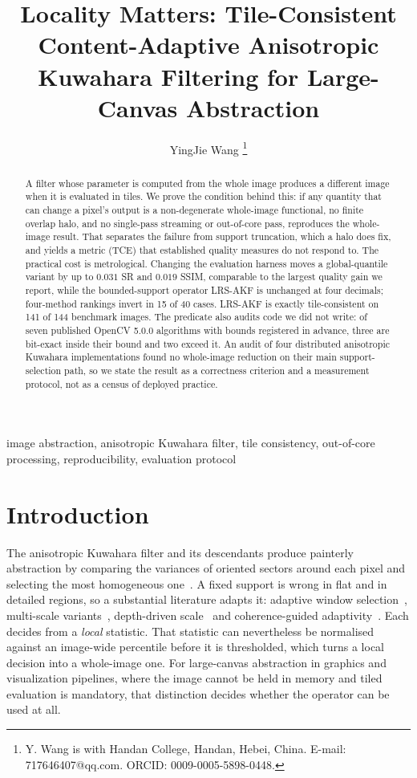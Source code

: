 \documentclass[journal]{IEEEtran}
\begin{document}
\title{Locality Matters: Tile-Consistent Content-Adaptive Anisotropic Kuwahara Filtering for Large-Canvas Abstraction}
\author{YingJie Wang%
\thanks{Y. Wang is with Handan College, Handan, Hebei, China.
E-mail: 717646407@qq.com. ORCID: 0009-0005-5898-0448.}%
}
\maketitle
\begin{abstract}
A filter whose parameter is computed from the whole image produces a different image when it is evaluated in tiles. We prove the condition behind this: if any quantity that can change a pixel's output is a non-degenerate whole-image functional, no finite overlap halo, and no single-pass streaming or out-of-core pass, reproduces the whole-image result. That separates the failure from support truncation, which a halo does fix, and yields a metric (TCE) that established quality measures do not respond to. The practical cost is metrological. Changing the evaluation harness moves a global-quantile variant by up to \(0.031\) SR and \(0.019\) SSIM, comparable to the largest quality gain we report, while the bounded-support operator LRS-AKF is unchanged at four decimals; four-method rankings invert in 15 of 40 cases. LRS-AKF is exactly tile-consistent on 141 of 144 benchmark images. The predicate also audits code we did not write: of seven published OpenCV 5.0.0 algorithms with bounds registered in advance, three are bit-exact inside their bound and two exceed it. An audit of four distributed anisotropic Kuwahara implementations found no whole-image reduction on their main support-selection path, so we state the result as a correctness criterion and a measurement protocol, not as a census of deployed practice.
\end{abstract}
\begin{IEEEkeywords}
image abstraction, anisotropic Kuwahara filter, tile consistency, out-of-core processing, reproducibility, evaluation protocol
\end{IEEEkeywords}
\section{Introduction}\label{sec:intro}

The anisotropic Kuwahara filter and its descendants produce painterly abstraction by comparing the variances of oriented sectors around each pixel and selecting the most homogeneous one~\cite{kuwahara1976,kyprianidis2009akf,kyprianidis2011msakf}. A fixed support is wrong in flat and in detailed regions, so a substantial literature adapts it: adaptive window selection~\cite{bartyzel2015adaptive,arya2024adaptive}, multi-scale variants~\cite{kyprianidis2011msakf}, depth-driven scale~\cite{ahn2010depth} and coherence-guided adaptivity~\cite{zang2015guided}. Each decides from a \emph{local} statistic. That statistic can nevertheless be normalised against an image-wide percentile before it is thresholded, which turns a local decision into a whole-image one. For large-canvas abstraction in graphics and visualization pipelines, where the image cannot be held in memory and tiled evaluation is mandatory, that distinction decides whether the operator can be used at all.
\end{document}
